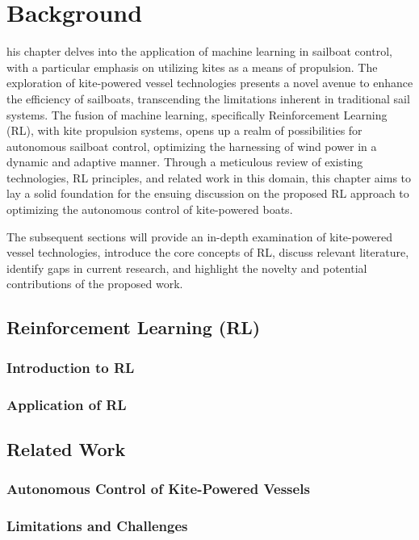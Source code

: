%

%
\let\textcircled=\pgftextcircled
\chapter{Background}
\label{chap:intro}

his chapter delves into the application of machine learning in sailboat control, with a particular emphasis on utilizing kites as a means of propulsion. The exploration of kite-powered vessel technologies presents a novel avenue to enhance the efficiency of sailboats, transcending the limitations inherent in traditional sail systems. The fusion of machine learning, specifically Reinforcement Learning (RL), with kite propulsion systems, opens up a realm of possibilities for autonomous sailboat control, optimizing the harnessing of wind power in a dynamic and adaptive manner. Through a meticulous review of existing technologies, RL principles, and related work in this domain, this chapter aims to lay a solid foundation for the ensuing discussion on the proposed RL approach to optimizing the autonomous control of kite-powered boats. 



The subsequent sections will provide an in-depth examination of kite-powered vessel technologies, introduce the core concepts of RL, discuss relevant literature, identify gaps in current research, and highlight the novelty and potential contributions of the proposed work. 


\section{Reinforcement Learning (RL)}
\subsection{Introduction to RL}

\subsection{Application of RL}

\section{Related Work}
\subsection{Autonomous Control of Kite-Powered Vessels}

\subsection{Limitations and Challenges}





